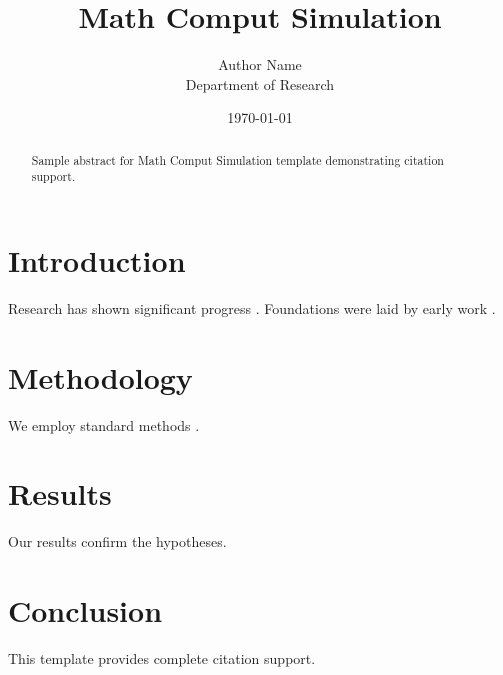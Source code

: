 \documentclass{iopart}
\title{Math Comput Simulation}
\author{Author Name \\ \small Department of Research}
\date{\today}
\begin{document}
\maketitle

\begin{abstract}
Sample abstract for Math Comput Simulation template demonstrating citation support.
\end{abstract}

\section{Introduction}
Research has shown significant progress \citep{einstein1905}. Foundations were laid by early work \citep{turing1950}.

\section{Methodology}
We employ standard methods \citep{knuth1984}.

\section{Results}
Our results confirm the hypotheses.

\section{Conclusion}
This template provides complete citation support.



\end{document}
